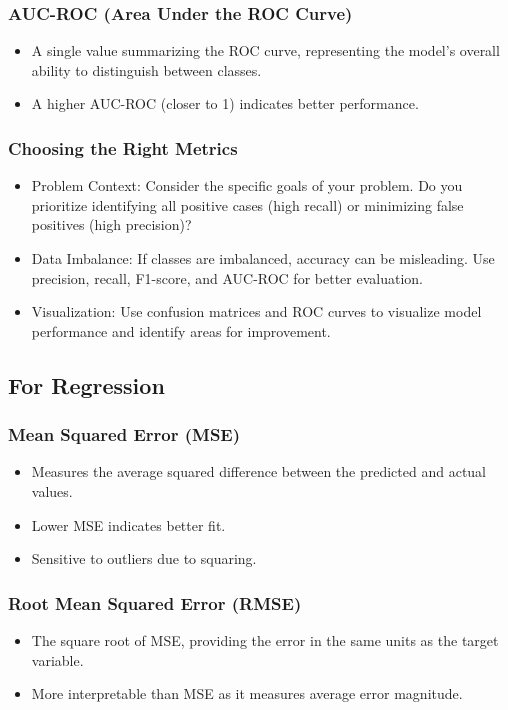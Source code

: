         \subsubsection{AUC-ROC (Area Under the ROC Curve)}
            \begin{itemize}
                \item A single value summarizing the ROC curve, representing the model's overall ability to distinguish between classes.
                \item A higher AUC-ROC (closer to 1) indicates better performance.
            \end{itemize}
        \subsubsection{Choosing the Right Metrics}
            \begin{itemize}
                \item Problem Context: Consider the specific goals of your problem. Do you prioritize identifying all positive cases (high recall) or minimizing false positives (high precision)?
                \item Data Imbalance: If classes are imbalanced, accuracy can be misleading. Use precision, recall, F1-score, and AUC-ROC for better evaluation.
                \item Visualization: Use confusion matrices and ROC curves to visualize model performance and identify areas for improvement.
            \end{itemize}

    \subsection{For Regression}
        \subsubsection{Mean Squared Error (MSE)}
            \begin{itemize}
                \item Measures the average squared difference between the predicted and actual values.
                \item Lower MSE indicates better fit.
                \item Sensitive to outliers due to squaring.
            \end{itemize}
        \subsubsection{Root Mean Squared Error (RMSE)}
            \begin{itemize}
                \item The square root of MSE, providing the error in the same units as the target variable.
                \item More interpretable than MSE as it measures average error magnitude.
            \end{itemize}
